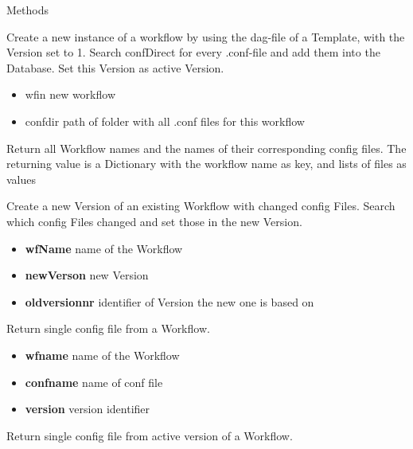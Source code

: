 \begin{methodenv}{Methods}

Create a new instance of a workflow by using the dag-file of a Template, 
with the Version set to 1. 
Search confDirect for every .conf-file and add them into the Database.
Set this Version as active Version.

\begin{itemize}
	\item wf\textunderscore in
	new workflow
	\item conf\textunderscore dir
	path of folder with all .conf files for this workflow
\end{itemize}


Return all Workflow names and the names of their corresponding config files.
The returning value is a Dictionary with the workflow name as key, and lists of files as values

Create a new Version of an existing Workflow with changed config Files.
Search which config Files changed and set those in the new Version.

\begin{itemize}
	\item \textbf{wf\textunderscore Name}
	name of the Workflow
	\item \textbf{new\textunderscore Verson}
	new Version
	\item \textbf{old\textunderscore version\textunderscore nr}
	identifier of Version the new one is based on
\end{itemize}

Return single config file from a Workflow.

\begin{itemize}
	\item \textbf{wf\textunderscore name}
	name of the Workflow
	\item \textbf{conf\textunderscore name}
	name of conf file
	\item \textbf{version}
	version identifier
\end{itemize}
Return single config file from active version of a Workflow.


\end{methodenv}
